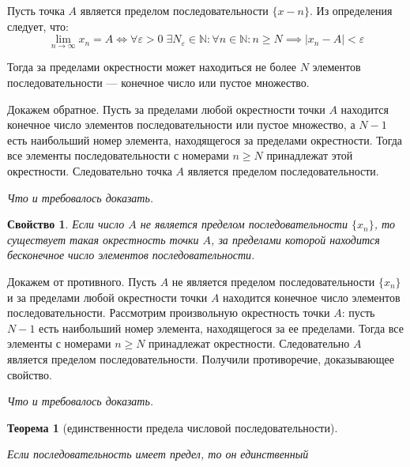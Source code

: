 \documentclass[a4paper,12pt,oneside]{extbook}
\newcommand{\newpar}{$ $\par\nobreak\ignorespaces}
\theoremstyle{numbered}
\newtheorem{property}{Свойство}[section]
\theoremstyle{unnumbered}
\newtheorem*{theorem*}{Теорема}
\theoremstyle{named}
\theoremstyle{unnumbered}
\theoremstyle{named}
\theoremstyle{named}
\theoremstyle{named}
\renewenvironment{proof}[1][]{\breakenv[Доказательство]{\if\relax\detokenize{#1}\relax\else\;\fi}{\textbf{#1}}}{\smallskip\newpar \hfill\textit{Что и требовалось доказать.}}
\begin{document}
\begin{proof}
    Пусть точка \(A\) является пределом последовательности \(\{x-n\}\). Из определения следует, что:
    \[
        \lim_{n \to \infty}{x_n} = A \iff
        \forall \varepsilon > 0 \; \exists N_{\varepsilon} \in \mathbb{N}: \forall n \in \mathbb{N}: n \geq N \implies |x_n - A| < \varepsilon
    \]

    Тогда за пределами окрестности может находиться не более \(N\) элементов последовательности — конечное число или пустое множество.

    Докажем обратное. Пусть за пределами любой окрестности точки \(A\) находится конечное число элементов последовательности или пустое множество, а \(N - 1\) есть наибольший номер элемента, находящегося за пределами окрестности. Тогда все элементы последовательности с номерами \(n \geq N\) принадлежат этой окрестности. Следовательно точка \(A\) является пределом последовательности.
\end{proof}

\begin{property}
    Если число \(A\) не является пределом последовательности \(\{x_n\}\), то существует такая окрестность точки \(A\), за пределами которой находится бесконечное число элементов последовательности.
\end{property}

\begin{proof}
    Докажем от противного. Пусть \(A\) не является пределом последовательности \(\{x_n\}\) и за пределами любой окрестности точки \(A\) находится конечное число элементов последовательности. Рассмотрим произвольную окрестность точки \(A\): пусть \(N - 1\) есть наибольший номер элемента, находящегося за ее пределами. Тогда все элементы с номерами \(n \geq N\) принадлежат окрестности. Следовательно \(A\) является пределом последовательности. Получили противоречие, доказывающее свойство.
\end{proof}

\begin{theorem*}[единственности предела числовой последовательности]
    \newpar
    Если последовательность имеет предел, то он единственный
\end{theorem*}
\end{document}

